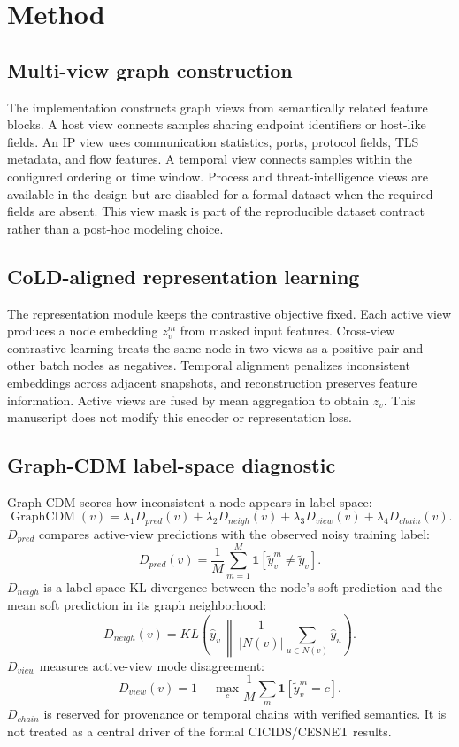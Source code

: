\documentclass[preprint,review,12pt]{elsarticle}
\begin{document}
\section{Method}
\subsection{Multi-view graph construction}
The implementation constructs graph views from semantically related feature
blocks. A host view connects samples sharing endpoint identifiers or host-like
fields. An IP view uses communication statistics, ports, protocol fields, TLS
metadata, and flow features. A temporal view connects samples within the
configured ordering or time window. Process and threat-intelligence views are
available in the design but are disabled for a formal dataset when the required
fields are absent. This view mask is part of the reproducible dataset contract
rather than a post-hoc modeling choice.

\subsection{CoLD-aligned representation learning}
The representation module keeps the contrastive objective fixed. Each active
view produces a node embedding $z_v^m$ from masked input features. Cross-view
contrastive learning treats the same node in two views as a positive pair and
other batch nodes as negatives. Temporal alignment penalizes inconsistent
embeddings across adjacent snapshots, and reconstruction preserves feature
information. Active views are fused by mean aggregation to obtain $z_v$. This
manuscript does not modify this
encoder or representation loss.

\subsection{Graph-CDM label-space diagnostic}
Graph-CDM scores how inconsistent a node appears in label space:
\begin{equation}
\operatorname{GraphCDM}(v)=
\lambda_1D_{pred}(v)+\lambda_2D_{neigh}(v)+
\lambda_3D_{view}(v)+\lambda_4D_{chain}(v).
\end{equation}
$D_{pred}$ compares active-view predictions with the observed noisy training label:
\begin{equation}
D_{pred}(v)=\frac{1}{M}\sum_{m=1}^M
\mathbf{1}\left[\tilde y_v^m \ne \tilde y_v\right].
\end{equation}
$D_{neigh}$ is a label-space KL divergence between the node's soft prediction
and the mean soft prediction in its graph neighborhood:
\begin{equation}
D_{neigh}(v)=KL\left(\hat y_v\,\middle\|\,\frac{1}{|N(v)|}\sum_{u\in N(v)}\hat y_u\right).
\end{equation}
$D_{view}$ measures active-view mode disagreement:
\begin{equation}
D_{view}(v)=1-\max_c \frac{1}{M}\sum_m \mathbf{1}\left[\tilde y_v^m=c\right].
\end{equation}
$D_{chain}$ is reserved for provenance or temporal chains with verified
semantics. It is not treated as a central driver of the formal CICIDS/CESNET
results.
\end{document}
